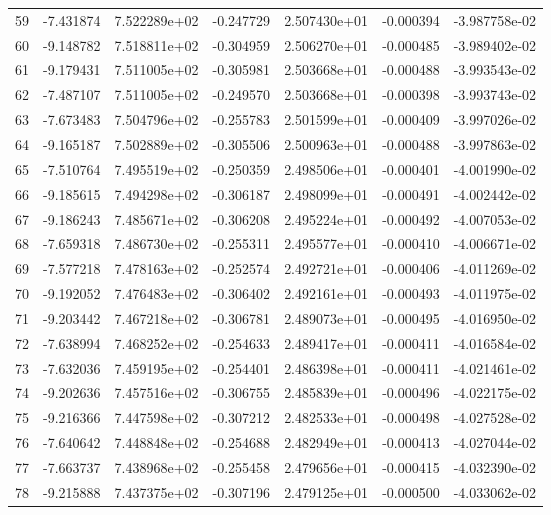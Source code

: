 \begin{tabular}{rrrrrrr}
  59 &  -7.431874 &  7.522289e+02 & -0.247729 &  2.507430e+01 &   -0.000394 & -3.987758e-02 \\
  60 &  -9.148782 &  7.518811e+02 & -0.304959 &  2.506270e+01 &   -0.000485 & -3.989402e-02 \\
  61 &  -9.179431 &  7.511005e+02 & -0.305981 &  2.503668e+01 &   -0.000488 & -3.993543e-02 \\
  62 &  -7.487107 &  7.511005e+02 & -0.249570 &  2.503668e+01 &   -0.000398 & -3.993743e-02 \\
  63 &  -7.673483 &  7.504796e+02 & -0.255783 &  2.501599e+01 &   -0.000409 & -3.997026e-02 \\
  64 &  -9.165187 &  7.502889e+02 & -0.305506 &  2.500963e+01 &   -0.000488 & -3.997863e-02 \\
  65 &  -7.510764 &  7.495519e+02 & -0.250359 &  2.498506e+01 &   -0.000401 & -4.001990e-02 \\
  66 &  -9.185615 &  7.494298e+02 & -0.306187 &  2.498099e+01 &   -0.000491 & -4.002442e-02 \\
  67 &  -9.186243 &  7.485671e+02 & -0.306208 &  2.495224e+01 &   -0.000492 & -4.007053e-02 \\
  68 &  -7.659318 &  7.486730e+02 & -0.255311 &  2.495577e+01 &   -0.000410 & -4.006671e-02 \\
  69 &  -7.577218 &  7.478163e+02 & -0.252574 &  2.492721e+01 &   -0.000406 & -4.011269e-02 \\
  70 &  -9.192052 &  7.476483e+02 & -0.306402 &  2.492161e+01 &   -0.000493 & -4.011975e-02 \\
  71 &  -9.203442 &  7.467218e+02 & -0.306781 &  2.489073e+01 &   -0.000495 & -4.016950e-02 \\
  72 &  -7.638994 &  7.468252e+02 & -0.254633 &  2.489417e+01 &   -0.000411 & -4.016584e-02 \\
  73 &  -7.632036 &  7.459195e+02 & -0.254401 &  2.486398e+01 &   -0.000411 & -4.021461e-02 \\
  74 &  -9.202636 &  7.457516e+02 & -0.306755 &  2.485839e+01 &   -0.000496 & -4.022175e-02 \\
  75 &  -9.216366 &  7.447598e+02 & -0.307212 &  2.482533e+01 &   -0.000498 & -4.027528e-02 \\
  76 &  -7.640642 &  7.448848e+02 & -0.254688 &  2.482949e+01 &   -0.000413 & -4.027044e-02 \\
  77 &  -7.663737 &  7.438968e+02 & -0.255458 &  2.479656e+01 &   -0.000415 & -4.032390e-02 \\
  78 &  -9.215888 &  7.437375e+02 & -0.307196 &  2.479125e+01 &   -0.000500 & -4.033062e-02 \\

\end{tabular}
